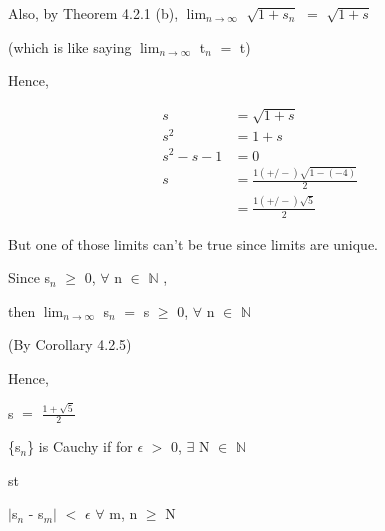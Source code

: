 \documentclass{article}
\newcommand{\mt}[1]{\ensuremath{#1}}
\newcommand{\bn}{\mt{\mathbb{N}} }       %
\newcommand{\ep}{\mt{\epsilon} }         %
\newcommand{\fa}{\mt{\forall} }          %
\newcommand{\mem}{\mt{\in} }
\newcommand{\exs}{\mt{\exists} }
\newcommand{\av}[1]{\mt{|}#1\mt{|}}  %
\newcommand{\bk}[1]{\{#1\}}
\newcommand{\ls}{\mt{<} }
\newcommand{\gr}{\mt{>} }
\newcommand{\gre}{\mt{\geq} }
\newcommand{\eql}{\mt{=} }
\newcommand{\uw}[2]{#1\mt{_{#2}}}
\newcommand{\lmti}[1]{\mt{\displaystyle{\lim_{#1 \to \infty}}}}
\newcommand{\eqn}[1]{\[#1\]}
\newcommand{\splt}[1]{\begin{split}#1\end{split}}
\begin{document}
{Also, by Theorem 4.2.1 (b), \lmti{n} $\sqrt{1 + s_n}$ \eql $\sqrt{1 + s}$

(which is like saying \lmti{n} \uw{t}{n} \eql t)

Hence,

\eqn{
	\splt{
		s & = \sqrt{1 + s} \\
		s^2 & = 1 + s \\
		s^2 - s - 1 & = 0 \\
		s & = \frac{1 (+/-) \sqrt{1 - (-4)}}{2} \\
		& = \frac{1 (+/-) \sqrt{5}}{2} 
	}
}

But one of those limits can't be true since limits are unique.

Since \uw{s}{n} \gre 0, \fa n \mem \bn,

then \lmti{n} \uw{s}{n} \eql s \gre 0, \fa n \mem \bn 

(By Corollary 4.2.5)

Hence, 

s \eql $\frac{1 + \sqrt{5}}{2}$

\bk{\uw{s}{n}} is Cauchy if for \ep \gr 0, \exs N \mem \bn

st

\av{\uw{s}{n} - \uw{s}{m}} \ls \ep \fa m, n \gre N

}
\end{document}
